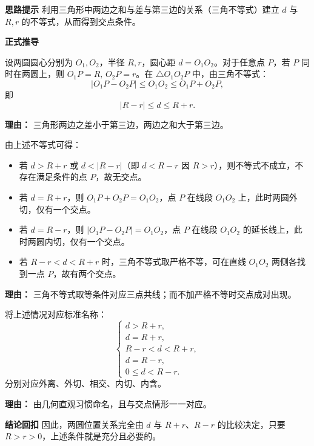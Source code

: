 \begin{proofbox}
	\textbf{\textcolor{CProof}{思路提示}}
	利用三角形中两边之和与差与第三边的关系（三角不等式）建立 $d$ 与 $R,r$ 的不等式，从而得到交点条件。

	\medskip
	\textbf{\textcolor{CProof}{正式推导}}
	\begin{description}[style=nextline, leftmargin=2.8em, labelsep=0.5em, itemsep=0.55em]
		\item[\textbf{步骤一（三角不等式建立）：}]
			设两圆圆心分别为 $O_1,O_2$，半径 $R,r$，圆心距 $d=O_1O_2$。对于任意点 $P$，若 $P$ 同时在两圆上，则 $O_1P=R,\,O_2P=r$。在 $\triangle O_1O_2P$ 中，由三角不等式：
			\[
				|O_1P - O_2P| \le O_1O_2 \le O_1P + O_2P,
			\]
			即
			\[
				|R - r| \le d \le R + r.
			\]
			\par\textbf{理由：} 三角形两边之差小于第三边，两边之和大于第三边。
		\item[\textbf{步骤二（交点个数分析）：}]
			由上述不等式可得：
			\begin{itemize}[leftmargin=*]
			\item 若 $d > R+r$ 或 $d < |R-r|$（即 $d < R-r$ 因 $R>r$），则不等式不成立，不存在满足条件的点 $P$，故无交点。
			\item 若 $d = R+r$，则 $O_1P+O_2P = O_1O_2$，点 $P$ 在线段 $O_1O_2$ 上，此时两圆外切，仅有一个交点。
			\item 若 $d = R-r$，则 $|O_1P-O_2P| = O_1O_2$，点 $P$ 在线段 $O_1O_2$ 的延长线上，此时两圆内切，仅有一个交点。
			\item 若 $R-r < d < R+r$ 时，三角不等式取严格不等，可在直线 $O_1O_2$ 两侧各找到一点 $P$，故有两个交点。
		\end{itemize}
			\par\textbf{理由：} 三角不等式取等条件对应三点共线；而不加严格不等时交点成对出现。
		\item[\textbf{步骤三（分类命名）：}]
			将上述情况对应标准名称：
			\[
				\begin{cases}
					d > R+r,\\ d = R+r,\\ R-r < d < R+r,\\ d = R-r,\\ 0 \le d < R-r.
			\end{cases}
			\]
			分别对应外离、外切、相交、内切、内含。
			\par\textbf{理由：} 由几何直观习惯命名，且与交点情形一一对应。
	\end{description}

	\medskip
	\textbf{\textcolor{CProof}{结论回扣}}
	因此，两圆位置关系完全由 $d$ 与 $R+r$、$R-r$ 的比较决定，只要 $R>r>0$，上述条件就是充分且必要的。
\end{proofbox}
